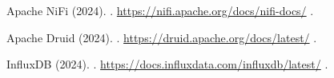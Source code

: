 \begin{thebibliography}{99}
    Apache NiFi (2024).
    .
    \newblock \url{https://nifi.apache.org/docs/nifi-docs/}
    \newblock [Accessed: 01/04/2025].

    Apache Druid (2024).
    .
    \newblock \url{https://druid.apache.org/docs/latest/}
    \newblock [Accessed: 01/04/2025].

    InfluxDB (2024).
    .
    \newblock \url{https://docs.influxdata.com/influxdb/latest/}
    \newblock [Accessed: 01/04/2025].

\end{thebibliography}
